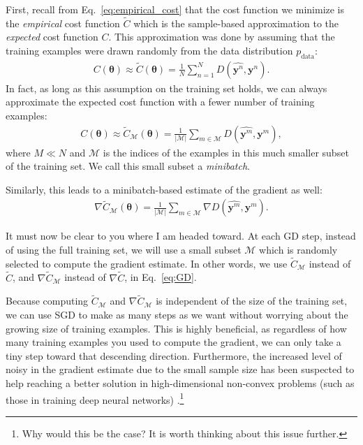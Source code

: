 \documentclass{report}
\newcommand{\vect}[1]{\mathbf{#1}}
\newcommand{\vects}[1]{\boldsymbol{#1}}
\newcommand{\vy}[0]{\vect{y}}
\newcommand{\TT}[0]{\vects{\theta}}
\newcommand{\MM}[0]{\mathcal{M}}
\begin{document}
First, recall from Eq.~\eqref{eq:empirical_cost} that the cost function we
minimize is the {\em empirical} cost function $\tilde{C}$ which is the
sample-based approximation to the {\em expected} cost function $C$. This
approximation was done by assuming that the training examples were drawn
randomly from the data distribution $p_{\text{data}}$:
\begin{align*}
    C(\TT) \approx \tilde{C}(\TT) = \frac{1}{N} \sum_{n=1}^N D(\hat{\vy^{n}},
    \vy^{n}).
\end{align*}
In fact, as long as this assumption on the training set holds, we can always
approximate the expected cost function with a fewer number of training examples:
\begin{align*}
    C(\TT) \approx \tilde{C}_\MM (\TT) = \frac{1}{|\MM|} \sum_{m \in \MM}
    D(\hat{\vy^{m}}, \vy^m),
\end{align*}
where $M \ll N$ and $\MM$ is the indices of the examples in this much smaller
subset of the training set. We call this small subset a {\em minibatch}.

Similarly, this leads to a minibatch-based estimate of the gradient as well:
\begin{align*}
    \nabla \tilde{C}_\MM (\TT) = \frac{1}{|\MM|} \sum_{m \in \MM} \nabla
    D(\hat{\vy^m}, \vy^m).
\end{align*}

It must now be clear to you where I am headed toward. At each GD step, instead
of using the full training set, we will use a small subset $\MM$ which is
randomly selected to compute the gradient estimate. In other words, we use
$\tilde{C}_\MM$ instead of $\tilde{C}$, and $\nabla \tilde{C}_\MM$ instead of
$\nabla \tilde{C}$, in Eq.~\eqref{eq:GD}. 

Because computing $\tilde{C}_\MM$ and $\nabla \tilde{C}_\MM$ is independent of
the size of the training set, we can use SGD to make as many steps as we want
without worrying about the growing size of training examples. This is highly
beneficial, as regardless of how many training examples you used to compute the
gradient, we can only take a tiny step toward that descending direction.
Furthermore, the increased level of noisy in the gradient estimate due to the
small sample size has been suspected to help reaching a better solution in 
high-dimensional non-convex problems (such as those in training deep neural
networks) \citep{Lecun1998a}.\footnote{
    Why would this be the case? It is worth thinking about this issue further.
}
\end{document}

